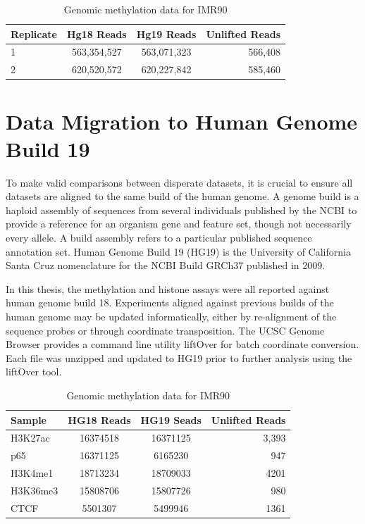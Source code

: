 \documentclass[phd,tocprelim]{cornell}
\begin{document}
\begin{table}
  \centering
  \begin{tabular}{lccr}
    \hline
    Replicate & Hg18 Reads & Hg19 Reads & Unlifted Reads \\ \hline
    1 & 563,354,527 & 563,071,323 & 566,408 \\
    2 & 620,520,572 & 620,227,842 & 585,460 \\
    \hline
  \end{tabular}
  \caption{Genomic methylation data for IMR90}
\end{table}

\chapter{Data Migration to Human Genome Build 19}

To make valid comparisons between disperate datasets, it is crucial to ensure all datasets are aligned to the same
build of the human genome.  A genome build is a haploid assembly of sequences from several individuals published by
the NCBI to provide a reference for an organism gene and feature set, though not necessarily every allele.  A build assembly
refers to a particular published sequence annotation set.  Human Genome Build 19 (HG19) is the University of California Santa
Cruz nomenclature for the NCBI Build GRCh37 published in 2009\cite{NCBI2015}.

In this thesis, the methylation and histone assays were all reported against human genome build 18.  Experiments aligned
against previous builds of the human genome may be updated informatically, either by re-alignment of the
sequence probes or through coordinate transposition.  The UCSC Genome Browser provides a command line utility liftOver for
batch coordinate conversion.  Each file was unzipped and updated to HG19 prior to further analysis using the liftOver tool.

\begin{table}
  \centering
  \begin{tabular}{lccr}
    \hline
    Sample & HG18 Reads & HG19 Seads & Unlifted Reads \\ \hline
    H3K27ac & 16374518 & 16371125 & 3,393 \\
    p65 & 16371125 & 6165230 & 947 \\
    H3K4me1 & 18713234 & 18709033 & 4201 \\
    H3K36me3 & 15808706 & 15807726 & 980 \\
    CTCF & 5501307 & 5499946 & 1361 \\
    \hline
  \end{tabular}
  \caption{Genomic methylation data for IMR90}
\end{table}
\end{document}
